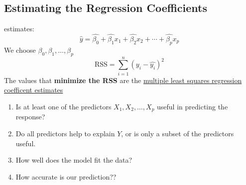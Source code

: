 \documentclass{article}
\begin{document}
\subsection*{Estimating the Regression Coefficients} 
estimates:
\begin{equation*} \hat{y} = \hat{\beta_0} + \hat{\beta_1} x_1 + \hat{\beta_2} x_2 + \cdots + \hat{\beta_p} x_p \end{equation*}
We choose $\beta_0, \beta_1, \dots, \beta_p$ 
\begin{equation*} \text{RSS} = \sum_{i=1}^{n} {(y_i - \hat{y_i})}^2 \end{equation*}
The values that \textbf{minimize the RSS} are the \underline{multiple least squares regression coefficent estimates}
\begin{enumerate}
    \item Is at least one of the predictors $X_1, X_2, \dots, X_p$ useful in predicting the response?
    \item Do all predictors help to explain $Y$, or is only a subset of the predictors useful.
    \item How well does the model fit the data?
    \item How accurate is our prediction??
\end{enumerate}
\vspace{4mm}
\end{document}
